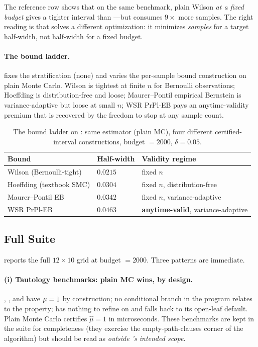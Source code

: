 The reference row shows that on the same benchmark, plain Wilson
\emph{at a fixed budget} gives a tighter interval than
---but consumes $9\times$ more samples.  The
right reading is that \toolname{} solves a different optimization:
it minimizes \emph{samples} for a target half-width, not half-width
for a fixed budget.

\paragraph{The bound ladder.}
 fixes the stratification (none) and varies
the per-sample bound construction on plain Monte Carlo.  Wilson is
tightest at finite $n$ for Bernoulli observations; Hoeffding is
distribution-free and loose; Maurer--Pontil empirical Bernstein is
variance-adaptive but loose at small $n$; WSR PrPl-EB pays an
anytime-validity premium that is recovered by the freedom to stop at
any sample count.

\begin{table}[t]
  \centering
  \caption{The bound ladder on : same
    estimator (plain MC), four different certified-interval
    constructions, budget $= 2000$, $\delta = 0.05$.}
  \label{tab:bound-ladder}
  \small
  \begin{tabular}{lll}
    \toprule
    Bound & Half-width & Validity regime \\
    \midrule
    Wilson (Bernoulli-tight) & $0.0215$ & fixed $n$ \\
    Hoeffding (textbook SMC) & $0.0304$ & fixed $n$, distribution-free \\
    Maurer--Pontil EB        & $0.0342$ & fixed $n$, variance-adaptive \\
    WSR PrPl-EB              & $0.0463$ & \textbf{anytime-valid}, variance-adaptive \\
    \bottomrule
  \end{tabular}
\end{table}

\subsection{Full Suite}\label{sec:suite}

 reports the full $12 \times 10$ grid at budget
$= 2000$.  Three patterns are immediate.

\paragraph{(i) Tautology benchmarks: plain MC wins, by design.}
, , and  have
$\mu = 1$ by construction; no conditional branch in the program
relates to the property; \toolname{} has nothing to refine on and
falls back to its open-leaf default.  Plain Monte Carlo certifies
$\hat\mu = 1$ in microseconds.  These benchmarks are kept in the
suite for completeness (they exercise the empty-path-clauses corner
of the algorithm) but should be read as \emph{outside \toolname{}'s
intended scope}.

